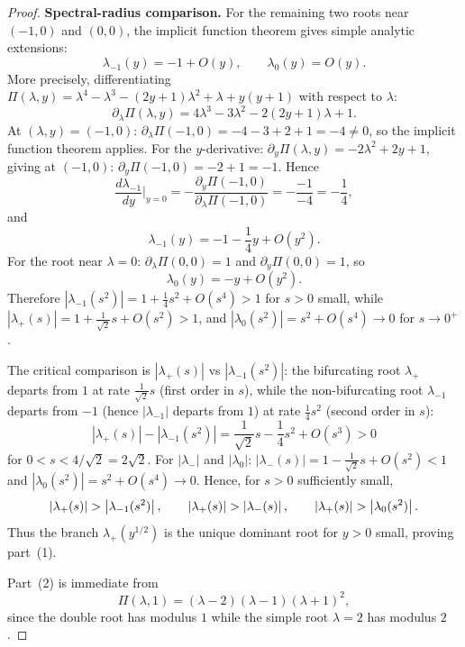 \begin{proof}
\medskip
\noindent\textbf{Spectral-radius comparison.}
For the remaining two roots near $(-1,0)$ and $(0,0)$, the implicit function theorem gives simple analytic extensions:
\begin{equation}\label{eq:other-roots-local}
\lambda_{-1}(y) = -1 + O(y),
\qquad
\lambda_0(y) = O(y).
\end{equation}
More precisely, differentiating $\Pi(\lambda,y)=\lambda^4-\lambda^3-(2y+1)\lambda^2+\lambda+y(y+1)$ with respect to $\lambda$:
\[
\partial_\lambda\Pi(\lambda,y) = 4\lambda^3-3\lambda^2-2(2y+1)\lambda+1.
\]
At $(\lambda,y)=(-1,0)$: $\partial_\lambda\Pi(-1,0) = -4-3+2+1=-4\neq 0$, so the implicit function theorem applies.
For the $y$-derivative: $\partial_y\Pi(\lambda,y)=-2\lambda^2+2y+1$, giving at $(-1,0)$: $\partial_y\Pi(-1,0)=-2+1=-1$.
Hence
\[
\frac{d\lambda_{-1}}{dy}\bigg|_{y=0} = -\frac{\partial_y\Pi(-1,0)}{\partial_\lambda\Pi(-1,0)} = -\frac{-1}{-4} = -\frac{1}{4},
\]
and
\[
\lambda_{-1}(y) = -1 - \frac{1}{4}y + O(y^2).
\]
For the root near $\lambda=0$: $\partial_\lambda\Pi(0,0)=1$ and $\partial_y\Pi(0,0)=1$, so
\[
\lambda_0(y) = -y+O(y^2).
\]
Therefore $|\lambda_{-1}(s^2)|=1+\tfrac{1}{4}s^2+O(s^4)>1$ for $s>0$ small, while $|\lambda_+(s)|=1+\tfrac{1}{\sqrt{2}}s+O(s^2)>1$, and $|\lambda_0(s^2)|=s^2+O(s^4)\to 0$ for $s\to 0^+$.

The critical comparison is $|\lambda_+(s)|$ vs $|\lambda_{-1}(s^2)|$: the bifurcating root $\lambda_+$ departs from $1$ at rate $\tfrac{1}{\sqrt{2}}s$ (first order in $s$), while the non-bifurcating root $\lambda_{-1}$ departs from $-1$ (hence $|\lambda_{-1}|$ departs from $1$) at rate $\tfrac{1}{4}s^2$ (second order in $s$):
\[
|\lambda_+(s)| - |\lambda_{-1}(s^2)| = \frac{1}{\sqrt{2}}s - \frac{1}{4}s^2 + O(s^3) > 0
\]
for $0<s<4/\sqrt{2}=2\sqrt{2}$.
For $|\lambda_-|$ and $|\lambda_0|$: $|\lambda_-(s)|=1-\tfrac{1}{\sqrt{2}}s+O(s^2)<1$ and $|\lambda_0(s^2)|=s^2+O(s^4)\to 0$.
Hence, for $s>0$ sufficiently small,
\begin{equation}\label{eq:dominance-ineqs}
\left\lvert \lambda_+(s)\right\rvert
>
\left\lvert \lambda_{-1}(s^2)\right\rvert,
\qquad
\left\lvert \lambda_+(s)\right\rvert
>
\left\lvert \lambda_-(s)\right\rvert,
\qquad
\left\lvert \lambda_+(s)\right\rvert
>
\left\lvert \lambda_0(s^2)\right\rvert.
\end{equation}
Thus the branch $\lambda_+(y^{1/2})$ is the unique dominant root for $y>0$ small, proving part~(1).

Part~(2) is immediate from
\[
\Pi(\lambda,1)=(\lambda-2)(\lambda-1)(\lambda+1)^2,
\]
since the double root has modulus \(1\) while the simple root \(\lambda=2\) has modulus \(2\).


\end{proof}
